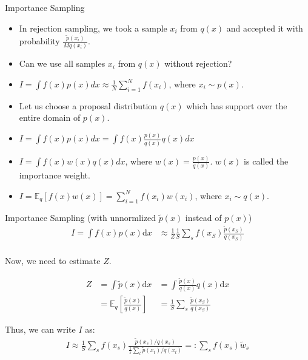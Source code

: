 \documentclass{beamer}
\begin{document}
\begin{frame}{Importance Sampling}
    \begin{itemize}
        \item In rejection sampling, we took a sample $x_i$ from $q(x)$ and accepted it with probability $\frac{\tilde{p}(x_i)}{M q(x_i)}$.
        \item Can we use all samples $x_i$ from $q(x)$ without rejection?
        \item $I = \int f(x) p(x) dx \approx \frac{1}{N} \sum_{i=1}^N f(x_i)$, where $x_i \sim p(x)$.
        \item Let us choose a proposal distribution $q(x)$ which has support over the entire domain of $p(x)$.
        \item $I = \int f(x) p(x) dx = \int f(x) \frac{p(x)}{q(x)} q(x) dx$
        \item $I = \int f(x) w(x) q(x) dx$, where $w(x) = \frac{p(x)}{q(x)}$. $w(x)$ is called the importance weight.
        \item $I = \mathbb{E}_q[f(x) w(x)] = \sum_{i=1}^N f(x_i) w(x_i)$, where $x_i \sim q(x)$.
    \end{itemize}
    
\end{frame}

\begin{frame}{Importance Sampling (with unnormlized $\tilde{p}(x)$ instead of $p(x)$)}
    \begin{equation}
        \begin{aligned}
        I = \int f(x) p(x) \mathrm{d} x & \approx \frac{1}{Z} \frac{1}{S} \sum_s f\left(x_S\right) \frac{\tilde{p}\left(x_S\right)}{q\left(x_S\right)} \\
        \end{aligned}
        \end{equation}

        Now, we need to estimate $Z$.

        \begin{equation}
        \begin{aligned}
        Z &= \int \tilde{p}(x) \mathrm{d} x &= \int \frac{\tilde{p}(x)}{q(x)} q(x) \mathrm{d} x \\
        &= \mathbb{E}_q \left[ \frac{\tilde{p}(x)}{q(x)} \right] &= \frac{1}{S} \sum_s \frac{\tilde{p}\left(x_S\right)}{q\left(x_S\right)}
        \end{aligned}
        \end{equation}

        Thus, we can write $I$ as:
        \begin{equation}
        \begin{aligned}
            I  \approx \frac{1}{S} \sum_s f\left(x_s\right) \frac{\tilde{p}\left(x_s\right) / q\left(x_s\right)}{\frac{1}{s} \sum_t \tilde{p}\left(x_t\right) / q\left(x_t\right)}=: \sum_s f\left(x_s\right) \tilde{w}_s
            \end{aligned}
        \end{equation}
\end{frame}
\end{document}

